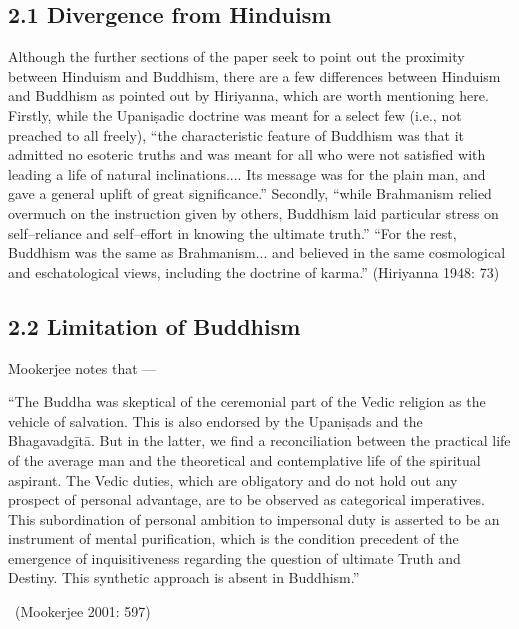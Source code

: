 \subsection*{2.1 Divergence from Hinduism}

Although the further sections of the paper seek to point out the proximity between Hinduism and Buddhism, there are a few differences between Hinduism and Buddhism as pointed out by Hiriyanna, which are worth mentioning here. Firstly, while the Upaniṣadic doctrine was meant for a select few (i.e., not preached to all freely), “the characteristic feature of Buddhism was that it admitted no esoteric truths and was meant for all who were not satisfied with leading a life of natural inclinations.... Its message was for the plain man, and gave a general uplift of great significance.” Secondly, “while Brahmanism relied overmuch on the instruction given by others, Buddhism laid particular stress on self–reliance and self–effort in knowing the ultimate truth.” “For the rest, Buddhism was the same as Brahmanism... and believed in the same cosmological and eschatological views, including the doctrine of karma.” (Hiriyanna 1948: 73)


\subsection*{2.2 Limitation of Buddhism}

Mookerjee notes that —

\begin{myquote}
“The Buddha was skeptical of the ceremonial part of the Vedic religion as the vehicle of salvation. This is also endorsed by the Upaniṣads and the Bhagavadgītā. But in the latter, we find a reconciliation between the practical life of the average man and the theoretical and contemplative life of the spiritual aspirant. The Vedic duties, which are obligatory and do not hold out any prospect of personal advantage, are to be observed as categorical imperatives. This subordination of personal ambition to impersonal duty is asserted to be an instrument of mental purification, which is the condition precedent of the emergence of inquisitiveness regarding the question of ultimate Truth and Destiny. This synthetic approach is absent in Buddhism.” 

~\hfill (Mookerjee 2001: 597)
\end{myquote}

